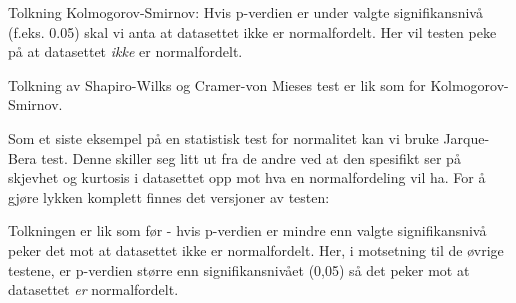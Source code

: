 \documentclass[
]{article}
\newenvironment{Shaded}{\begin{snugshade}}{\end{snugshade}}
\newcommand{\AttributeTok}[1]{\textcolor[rgb]{0.77,0.63,0.00}{#1}}
\newcommand{\CommentTok}[1]{\textcolor[rgb]{0.56,0.35,0.01}{\textit{#1}}}
\newcommand{\DecValTok}[1]{\textcolor[rgb]{0.00,0.00,0.81}{#1}}
\newcommand{\FunctionTok}[1]{\textcolor[rgb]{0.00,0.00,0.00}{#1}}
\newcommand{\NormalTok}[1]{#1}
\newcommand{\OtherTok}[1]{\textcolor[rgb]{0.56,0.35,0.01}{#1}}
\newcommand{\SpecialCharTok}[1]{\textcolor[rgb]{0.00,0.00,0.00}{#1}}
\newcommand{\StringTok}[1]{\textcolor[rgb]{0.31,0.60,0.02}{#1}}
\begin{document}
Tolkning Kolmogorov-Smirnov: Hvis p-verdien er under valgte signifikansnivå (f.eks. 0.05) skal vi anta at datasettet ikke er normalfordelt. Her vil testen peke på at datasettet \emph{ikke} er normalfordelt.

Tolkning av Shapiro-Wilks og Cramer-von Mieses test er lik som for Kolmogorov-Smirnov.

Som et siste eksempel på en statistisk test for normalitet kan vi bruke Jarque-Bera test. Denne skiller seg litt ut fra de andre ved at den spesifikt ser på skjevhet og kurtosis i datasettet opp mot hva en normalfordeling vil ha. For å gjøre lykken komplett finnes det versjoner av testen:

\begin{Shaded}
\end{Shaded}

\begin{Shaded}
\end{Shaded}

Tolkningen er lik som før - hvis p-verdien er mindre enn valgte signifikansnivå peker det mot at datasettet ikke er normalfordelt. Her, i motsetning til de øvrige testene, er p-verdien større enn signifikansnivået (0,05) så det peker mot at datasettet \emph{er} normalfordelt.
\end{document}

